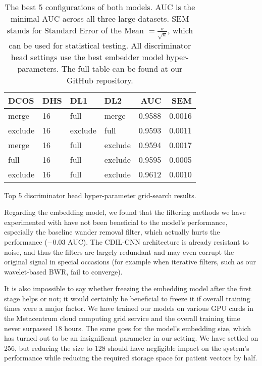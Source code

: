 \documentclass[preprint,12pt]{elsarticle}
\begin{document}
\begin{table}[!htb]
    \begin{subtable}{\linewidth}
      \centering
        \begin{tabular}{llllrr}
            \toprule
            \textbf{DCOS} & \textbf{DHS} & \textbf{DL1} & \textbf{DL2} &  \textbf{AUC} & \textbf{SEM} \\
            \midrule
            merge &                        16 &                      full &                     merge &  0.9588 &  0.0016 \\
            exclude &                        16 &                      exclude &                      full &  0.9593 &  0.0011 \\
            merge &                        16 &                      full &                      exclude &  0.9594 &  0.0017\\
            full &                        16 &                      full &                      exclude &  0.9595 &  0.0005\\
            exclude &                        16 &                      full &                      exclude &  0.9612 &  0.0010\\
        \bottomrule
        \end{tabular}
        \caption{Top 5 discriminator head hyper-parameter grid-search results.}
        \label{tab:gridsearch-2}
    \end{subtable} 
    \caption{The best 5 configurations of both models. AUC is the minimal AUC across all three large datasets. SEM stands for Standard Error of the Mean $= \frac{\sigma}{\sqrt{n}}$, which can be used for statistical testing. All discriminator head settings use the best embedder model hyper-parameters. The full table can be found at our GitHub repository.}
\end{table}

Regarding the embedding model, we found that the filtering methods we have experimented with have not been beneficial to the model's performance, especially the baseline wander removal filter, which actually hurts the performance ($-0.03$ AUC). The CDIL-CNN architecture is already resistant to noise, and thus the filters are largely redundant and may even corrupt the original signal in special occasions (for example when iterative filters, such as our wavelet-based BWR, fail to converge). 

It is also impossible to say whether freezing the embedding model after the first stage helps or not; it would certainly be beneficial to freeze it if overall training times were a major factor. We have trained our models on various GPU cards in the Metacentrum cloud computing grid service and the overall training time never surpassed 18 hours. The same goes for the model's embedding size, which has turned out to be an insignificant parameter in our setting. We have settled on 256, but reducing the size to 128 should have negligible impact on the system's performance while reducing the required storage space for patient vectors by half.
\end{document}
